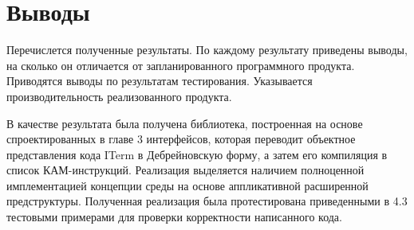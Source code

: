 


\section{Выводы}

\begin{annotation}
	Перечислется полученные результаты. По каждому результату приведены выводы, на сколько он отличается от запланированного программного продукта. Приводятся выводы по результатам тестирования. Указывается производительность реализованного продукта.
\end{annotation}

В качестве результата была получена библиотека, построенная на основе спроектированных в главе 3 интерфейсов, которая переводит объектное представления кода ITerm в Дебрейновскую форму, а затем его компиляция в список КАМ-инструкций. Реализация выделяется наличием полноценной имплементацией концепции среды на основе аппликативной расширенной предструктуры. Полученная реализация была протестирована приведенными в 4.3 тестовыми примерами для проверки корректности написанного кода.
